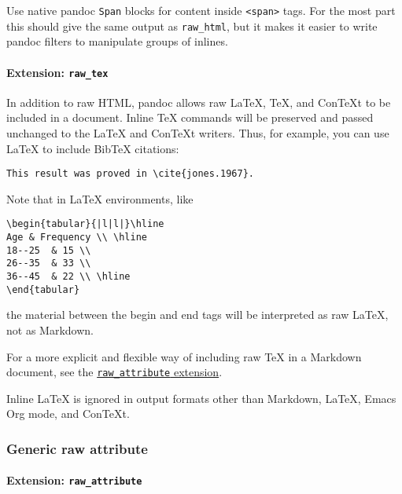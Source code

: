 Use native pandoc \texttt{Span} blocks for content inside
\texttt{\textless{}span\textgreater{}} tags. For the most part this
should give the same output as \texttt{raw\_html}, but it makes it
easier to write pandoc filters to manipulate groups of inlines.

\hypertarget{extension-raw_tex}{%
\paragraph{\texorpdfstring{Extension:
\texttt{raw\_tex}}{Extension: raw\_tex}}\label{extension-raw_tex}}

In addition to raw HTML, pandoc allows raw LaTeX, TeX, and ConTeXt to be
included in a document. Inline TeX commands will be preserved and passed
unchanged to the LaTeX and ConTeXt writers. Thus, for example, you can
use LaTeX to include BibTeX citations:

\begin{verbatim}
This result was proved in \cite{jones.1967}.
\end{verbatim}

Note that in LaTeX environments, like

\begin{verbatim}
\begin{tabular}{|l|l|}\hline
Age & Frequency \\ \hline
18--25  & 15 \\
26--35  & 33 \\
36--45  & 22 \\ \hline
\end{tabular}
\end{verbatim}

the material between the begin and end tags will be interpreted as raw
LaTeX, not as Markdown.

For a more explicit and flexible way of including raw TeX in a Markdown
document, see the
\protect\hyperlink{extension-raw_attribute}{\texttt{raw\_attribute}
extension}.

Inline LaTeX is ignored in output formats other than Markdown, LaTeX,
Emacs Org mode, and ConTeXt.

\hypertarget{generic-raw-attribute}{%
\subsubsection{Generic raw attribute}\label{generic-raw-attribute}}

\hypertarget{extension-raw_attribute}{%
\paragraph{\texorpdfstring{Extension:
\texttt{raw\_attribute}}{Extension: raw\_attribute}}\label{extension-raw_attribute}}

